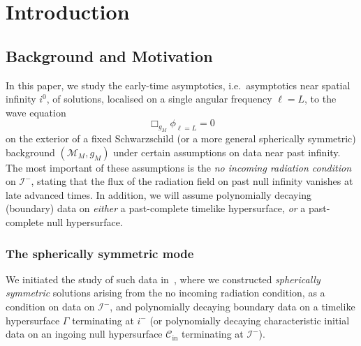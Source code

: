 \documentclass[11pt,english]{article}
\numberwithin{equation}{section}
\theoremstyle{remark}
\theoremstyle{plain}
\theoremstyle{remark}
\renewcommand{\(}{\left(}
\renewcommand{\)}{\right)}
\begin{document}
\section{Introduction}
\subsection{Background and Motivation}
In this paper, we study the early-time asymptotics, i.e.\ asymptotics near spatial infinity $i^0$, of solutions, localised on a single angular frequency $\ell=L$, to the wave equation
\begin{equation}\label{waveequation}
\Box_{g_M}\phi_{\ell=L}=0
\end{equation}
on the exterior of a fixed Schwarzschild (or a more general spherically symmetric) background $(\mathcal{M}_M,g_M)$ under certain assumptions on data near past infinity. 
The most important of these assumptions is the \textit{no incoming radiation condition} on $\mathcal{I}^-$, stating that the flux of the radiation field on past null infinity vanishes at late advanced times. In addition, we will assume polynomially decaying (boundary) data on \textit{either} a past-complete timelike hypersurface, \textit{or} a past-complete null hypersurface.
\subsubsection{The spherically symmetric mode}\label{sec:subsec:intro:sphsym}
We initiated the study of such data in~\cite{I}, where we constructed \textit{spherically symmetric} solutions arising from the no incoming radiation condition, as a condition on data on $\mathcal{I}^-$, and polynomially decaying boundary data on a timelike hypersurface $\Gamma$ terminating at $i^-$ (or polynomially decaying characteristic initial data on an ingoing null hypersurface $\mathcal{C}_{\mathrm{in}}$ terminating at $\mathcal{I}^-$). 
\end{document}
